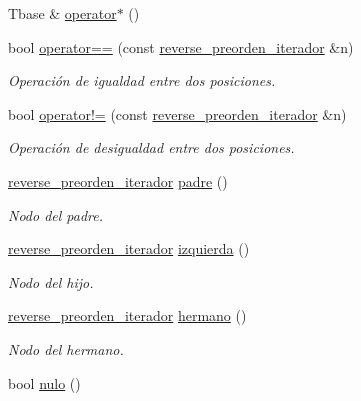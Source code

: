 \begin{DoxyCompactItemize}
Tbase \& \hyperlink{classArbolGeneral_1_1reverse__preorden__iterador_a159fd764b91fefacaece5c8c4cbb66fb}{operator$\ast$} ()
\item 
bool \hyperlink{classArbolGeneral_1_1reverse__preorden__iterador_a9ed2cebf9531952f629c3f3f20eccb3d}{operator==} (const \hyperlink{classArbolGeneral_1_1reverse__preorden__iterador}{reverse\-\_\-preorden\-\_\-iterador} \&n)
\begin{DoxyCompactList}\small\item\em Operación de igualdad entre dos posiciones. \end{DoxyCompactList}\item 
bool \hyperlink{classArbolGeneral_1_1reverse__preorden__iterador_a908b03ace52ea925b7592b7b45814822}{operator!=} (const \hyperlink{classArbolGeneral_1_1reverse__preorden__iterador}{reverse\-\_\-preorden\-\_\-iterador} \&n)
\begin{DoxyCompactList}\small\item\em Operación de desigualdad entre dos posiciones. \end{DoxyCompactList}\item 
\hyperlink{classArbolGeneral_1_1reverse__preorden__iterador}{reverse\-\_\-preorden\-\_\-iterador} \hyperlink{classArbolGeneral_1_1reverse__preorden__iterador_a3b80852dfc52aba8b888246f81c8ca6d}{padre} ()
\begin{DoxyCompactList}\small\item\em Nodo del padre. \end{DoxyCompactList}\item 
\hyperlink{classArbolGeneral_1_1reverse__preorden__iterador}{reverse\-\_\-preorden\-\_\-iterador} \hyperlink{classArbolGeneral_1_1reverse__preorden__iterador_a330e28fcf945bdd4034706be1bc7261a}{izquierda} ()
\begin{DoxyCompactList}\small\item\em Nodo del hijo. \end{DoxyCompactList}\item 
\hyperlink{classArbolGeneral_1_1reverse__preorden__iterador}{reverse\-\_\-preorden\-\_\-iterador} \hyperlink{classArbolGeneral_1_1reverse__preorden__iterador_a6af3b59622656609904b308c7b5532b4}{hermano} ()
\begin{DoxyCompactList}\small\item\em Nodo del hermano. \end{DoxyCompactList}\item 
bool \hyperlink{classArbolGeneral_1_1reverse__preorden__iterador_ae2f6fe815da3cd60b18623dc519166c3}{nulo} ()

\end{DoxyCompactItemize}
